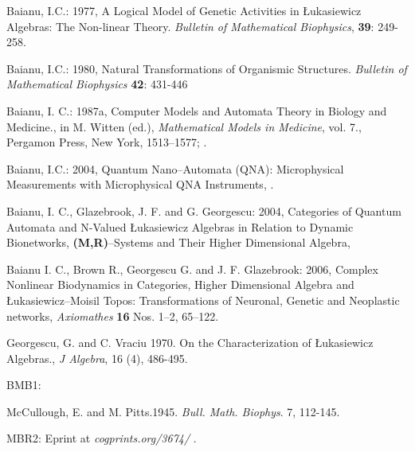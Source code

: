 \documentclass[12pt]{article}
\theoremstyle{plain}
\theoremstyle{definition}
\theoremstyle{plain}
\numberwithin{equation}{section}
\begin{document}
\begin{thebibliography}{9}
Baianu, I.C.: 1977, A Logical Model of Genetic Activities in \L ukasiewicz
Algebras: The Non-linear Theory. \emph{Bulletin of Mathematical Biophysics},
\textbf{39}: 249-258.

Baianu, I.C.: 1980, Natural Transformations of Organismic Structures. \emph{Bulletin of Mathematical Biophysics}
\textbf{42}: 431-446


Baianu, I. C.: 1987a, Computer Models and Automata Theory in Biology and Medicine.,  in M. Witten 
(ed.), \emph{Mathematical Models in Medicine}, vol. 7., Pergamon Press, New York, 1513--1577;  .

Baianu, I.C.: 2004, Quantum Nano--Automata (QNA): Microphysical Measurements with Microphysical QNA Instruments, .


Baianu, I. C., Glazebrook, J. F. and G. Georgescu: 2004,
Categories of Quantum Automata and N-Valued \L ukasiewicz Algebras
in Relation to Dynamic Bionetworks, \textbf{(M,R)}--Systems and
Their Higher Dimensional Algebra,  

Baianu I. C., Brown R., Georgescu G. and J. F. Glazebrook: 2006,
Complex Nonlinear Biodynamics in Categories, Higher Dimensional
Algebra and \L ukasiewicz--Moisil Topos: Transformations of
Neuronal, Genetic and Neoplastic networks, \emph{Axiomathes}
\textbf{16} Nos. 1--2, 65--122.

Georgescu, G. and C. Vraciu 1970. On the Characterization of \L ukasiewicz Algebras., \emph{J Algebra}, 16 (4), 486-495.

BMB1:

McCullough, E. and M. Pitts.1945. {\em Bull. Math. Biophys}. 7, 112-145.

MBR2: Eprint at \emph{cogprints.org/3674/}
.

\end{thebibliography}

\end{document}
